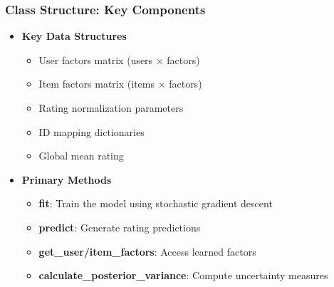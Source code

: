 \documentclass{beamer}
\begin{document}
\begin{frame}
\frametitle{Class Structure: Key Components}

\begin{itemize}
    \item \textbf{Key Data Structures}
    \begin{itemize}
        \item User factors matrix (users × factors)
        \item Item factors matrix (items × factors)
        \item Rating normalization parameters
        \item ID mapping dictionaries
        \item Global mean rating
    \end{itemize}

    \vspace{1cm}
    
    \item \textbf{Primary Methods}
    \begin{itemize}
        \item \textbf{fit}: Train the model using stochastic gradient descent
        \item \textbf{predict}: Generate rating predictions
        \item \textbf{get\_user/item\_factors}: Access learned factors
        \item \textbf{calculate\_posterior\_variance}: Compute uncertainty measures
    \end{itemize}
\end{itemize}
\end{frame}
\end{document}
